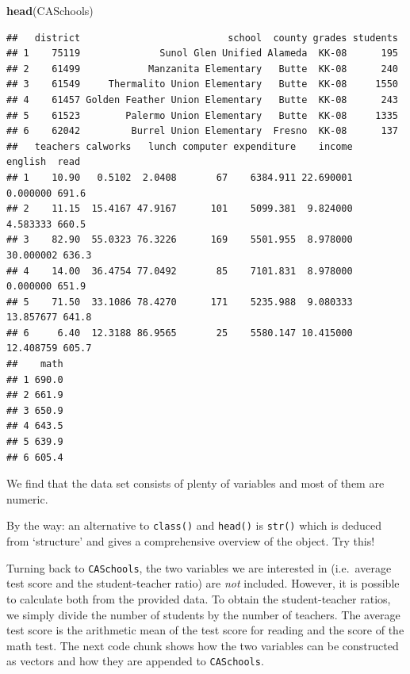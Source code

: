 \documentclass[]{book}
\newenvironment{Shaded}{\begin{snugshade}}{\end{snugshade}}
\newcommand{\KeywordTok}[1]{\textcolor[rgb]{0.13,0.29,0.53}{\textbf{#1}}}
\newcommand{\DecValTok}[1]{\textcolor[rgb]{0.00,0.00,0.81}{#1}}
\newcommand{\StringTok}[1]{\textcolor[rgb]{0.31,0.60,0.02}{#1}}
\newcommand{\CommentTok}[1]{\textcolor[rgb]{0.56,0.35,0.01}{\textit{#1}}}
\newcommand{\OperatorTok}[1]{\textcolor[rgb]{0.81,0.36,0.00}{\textbf{#1}}}
\newcommand{\NormalTok}[1]{#1}
\theoremstyle{definition}
\theoremstyle{definition}
\theoremstyle{definition}
\theoremstyle{remark}
\begin{document}
\begin{Shaded}
\begin{Highlighting}[]
\KeywordTok{head}\NormalTok{(CASchools)}
\end{Highlighting}
\end{Shaded}

\begin{verbatim}
##   district                          school  county grades students
## 1    75119              Sunol Glen Unified Alameda  KK-08      195
## 2    61499            Manzanita Elementary   Butte  KK-08      240
## 3    61549     Thermalito Union Elementary   Butte  KK-08     1550
## 4    61457 Golden Feather Union Elementary   Butte  KK-08      243
## 5    61523        Palermo Union Elementary   Butte  KK-08     1335
## 6    62042         Burrel Union Elementary  Fresno  KK-08      137
##   teachers calworks   lunch computer expenditure    income   english  read
## 1    10.90   0.5102  2.0408       67    6384.911 22.690001  0.000000 691.6
## 2    11.15  15.4167 47.9167      101    5099.381  9.824000  4.583333 660.5
## 3    82.90  55.0323 76.3226      169    5501.955  8.978000 30.000002 636.3
## 4    14.00  36.4754 77.0492       85    7101.831  8.978000  0.000000 651.9
## 5    71.50  33.1086 78.4270      171    5235.988  9.080333 13.857677 641.8
## 6     6.40  12.3188 86.9565       25    5580.147 10.415000 12.408759 605.7
##    math
## 1 690.0
## 2 661.9
## 3 650.9
## 4 643.5
## 5 639.9
## 6 605.4
\end{verbatim}

We find that the data set consists of plenty of variables and most of
them are numeric.

By the way: an alternative to \texttt{class()} and \texttt{head()} is
\texttt{str()} which is deduced from `structure' and gives a
comprehensive overview of the object. Try this!

Turning back to \texttt{CASchools}, the two variables we are interested
in (i.e.~average test score and the student-teacher ratio) are
\emph{not} included. However, it is possible to calculate both from the
provided data. To obtain the student-teacher ratios, we simply divide
the number of students by the number of teachers. The average test score
is the arithmetic mean of the test score for reading and the score of
the math test. The next code chunk shows how the two variables can be
constructed as vectors and how they are appended to \texttt{CASchools}.

\begin{Shaded}
\end{Shaded}
\end{document}
